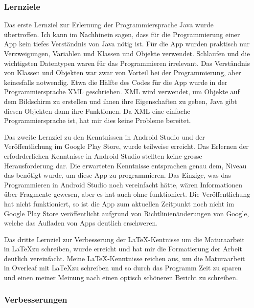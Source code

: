 \subsubsection{Lernziele}

Das erste Lernziel zur Erlernung der Programmiersprache Java wurde übertroffen. Ich kann im Nachhinein sagen, dass für die Programmierung einer App kein tiefes Verständnis von Java nötig ist. Für die App wurden praktisch nur Verzweigungen, Variablen und Klassen und Objekte verwendet. Schlaufen und die wichtigsten Datentypen waren für das Programmieren irrelevant. Das Verständnis von Klassen und Objekten war zwar von Vorteil bei der Programmierung, aber keinesfalls notwendig. Etwa die Hälfte des Codes für die App wurde in der Programmiersprache XML geschrieben. XML wird verwendet, um Objekte auf dem Bildschirm zu erstellen und ihnen ihre Eigenschaften zu geben, Java gibt diesen Objekten dann ihre Funktionen. Da XML eine einfache Programmiersprache ist, hat mir dies keine Probleme bereitet. \par
Das zweite Lernziel zu den Kenntnissen in Android Studio und der Veröffentlichung im Google Play Store, wurde teilweise erreicht. Das Erlernen der erfodrderlichen Kenntnisse in Android Studio stellten keine grosse Herausforderung dar. Die erwarteten Kenntnisse entsprachen genau dem, Niveau das benötigt wurde, um diese App zu programmieren. Das Einzige, was das Programmieren in Android Studio noch vereinfacht hätte, wären Informationen über Fragmente gewesen, aber es hat auch ohne funktioniert. Die Veröffentlichung hat nicht funktioniert, so ist die App zum aktuellen Zeitpunkt noch nicht im Google Play Store veröffentlicht aufgrund von Richtlinienänderungen von Google, welche das Aufladen von Apps deutlich erschweren. \par
Das dritte Lernziel zur Verbesserung der \LaTeX -Kentnisse um die Maturaarbeit in \LaTeX zu schreiben, wurde erreicht und hat mir die Formatierung der Arbeit deutlich vereinfacht. Meine \LaTeX -Kenntnisse reichen aus, um die Maturaarbeit in Overleaf mit \LaTeX zu schreiben und so durch das Programm Zeit zu sparen und einen meiner Meinung nach einen optisch schöneren Bericht zu schreiben.

\subsubsection{Verbesserungen}

